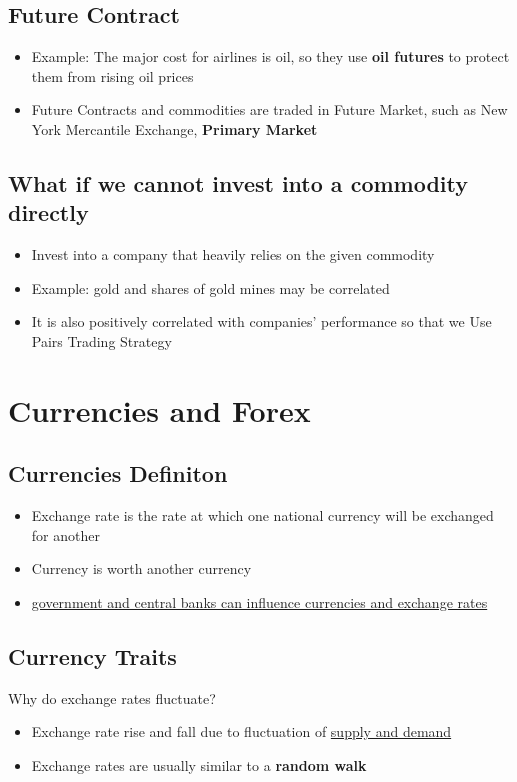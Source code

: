 \documentclass{article}
\begin{document}
\subsection{Future Contract}
\begin{itemize}
\item Example: The major cost for airlines is oil, so they use \textbf{oil futures} to protect them from rising oil prices
\item Future Contracts and commodities are traded in Future Market, such as New York Mercantile Exchange, \textbf{Primary Market}
\end{itemize}

\subsection{What if we cannot invest into a commodity directly}
\begin{itemize}
\item Invest into a company that heavily relies on the given commodity
\item Example: gold and shares of gold mines may be correlated
\item It is also positively correlated with companies' performance so that we Use Pairs Trading Strategy
\end{itemize}

\section{Currencies and Forex}
\subsection{Currencies Definiton}
\begin{itemize}
\item Exchange rate is the rate at which one national currency will be exchanged for another
\item Currency is worth another currency
\item \underline{government and central banks can influence currencies and exchange rates}
\end{itemize}

\subsection{Currency Traits}
Why do exchange rates fluctuate?
\begin{itemize}
\item Exchange rate rise and fall due to fluctuation of \underline{supply and demand}
\item Exchange rates are usually similar to a \textbf{random walk}
\end{itemize}
\end{document}
